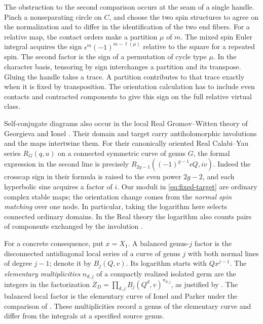 The obstruction to the second comparison occurs at the seam of a
single handle. Pinch a nonseparating circle on \(C\), and choose the
two spin structures to agree on the normalization and to differ in the
identification of the two end fibers. For a relative map, the contact
orders make a partition \(\mu\) of \(m\). The mixed spin Euler integral
acquires the sign \(\epsilon^m(-1)^{m-\ell(\mu)}\) relative to the
square for a repeated spin. The second factor is the sign of a
permutation of cycle type \(\mu\). In the character basis, tensoring
by sign interchanges a partition and its transpose. Gluing the handle
takes a trace. A partition contributes to that trace exactly when
it is fixed by transposition. The orientation calculation has to
include even contacts and contracted components to give this sign
on the full relative virtual class.

Self-conjugate diagrams also occur in the local Real Gromov--Witten
theory of Georgieva and Ionel \cite[Theorem~1.1 and Corollary~9.14]{gi}.
Their domain and target carry antiholomorphic involutions and the
maps intertwine them. For their canonically oriented Real
Calabi--Yau series \(R_G(q,u)\) on a connected symmetric curve of
genus \(G\), the formal expression in the second line is precisely
\(R_{2g-1}((-1)^{g-1}\epsilon Q,iv)\). Indeed the crosscap sign in
their formula is raised to the even power \(2g-2\), and each
hyperbolic sine acquires a factor of \(i\). Our moduli in
\eqref{eq:fixed-target} are ordinary complex stable maps; the
orientation change comes from the \emph{normal spin matching} over
one node. In particular, taking the logarithm here selects connected
ordinary domains. In the Real theory the logarithm also counts pairs
of components exchanged by the involution \cite[(2.16)]{gi}.

For a concrete consequence, put \(x=X_1\). A balanced genus-\(j\)
factor is the disconnected antidiagonal local series of a curve of
genus \(j\) with both normal lines of degree \(j-1\); denote it
by \(B_j(Q,v)\). Its logarithm starts with \(Qx^{j-1}\).
The \emph{elementary multiplicities} \(n_{d,j}\) of a compactly
realized isolated germ are the integers in the factorization
\(Z_D=\prod_{d,j} B_j(Q^d,v)^{n_{d,j}}\), as justified by
\cite[Proposition~3.1]{WueUnramified}. The balanced local factor is the elementary curve of Ionel and Parker under the comparison of \cite[\S3]{WueProduct}. These multiplicities record a genus of the elementary
curve and differ from the integrals at a specified source genus.

